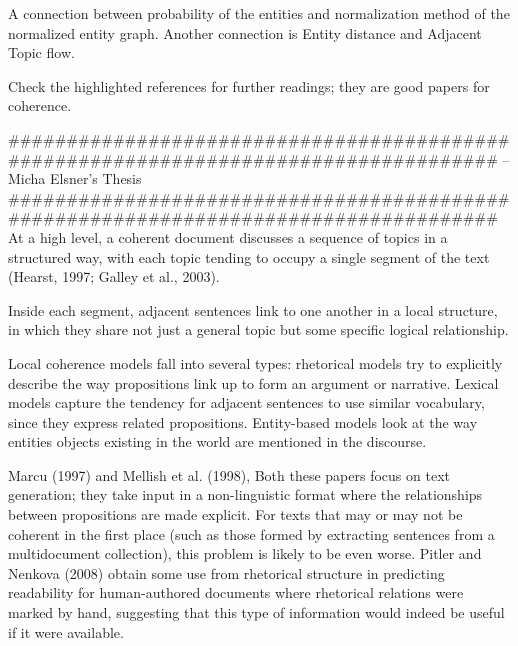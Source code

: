 A connection between probability of the entities and normalization method of the normalized entity graph. Another connection is Entity distance and Adjacent Topic flow.

Check the highlighted references for further readings; they are good papers for coherence.

#####################################################################################
 \cite{} -- Micha Elsner's Thesis
#####################################################################################
At a high level, a coherent document discusses a sequence of topics in a structured way, with each topic
tending to occupy a single segment of the text (Hearst, 1997; Galley et al., 2003).


Inside each segment, adjacent sentences link to one another in a local structure, in which they share
not just a general topic but some specific logical relationship.

Local coherence models fall into several types: rhetorical models try to explicitly describe the way propositions link up to form an argument or narrative. 
Lexical models capture the tendency for adjacent sentences to use similar vocabulary, since they
express related propositions. 
Entity-based models look at the way entities objects existing in the world are
mentioned in the discourse.

Marcu (1997) and Mellish et al. (1998), Both these papers focus on text generation; they take
input in a non-linguistic format where the relationships between propositions are made explicit. 
For texts that may or may not be coherent in the first place (such as those formed
by extracting sentences from a multidocument collection), this problem is likely to be even worse. Pitler
and Nenkova (2008) obtain some use from rhetorical structure in predicting readability for human-authored
documents where rhetorical relations were marked by hand, suggesting that this type of information would
indeed be useful if it were available.

